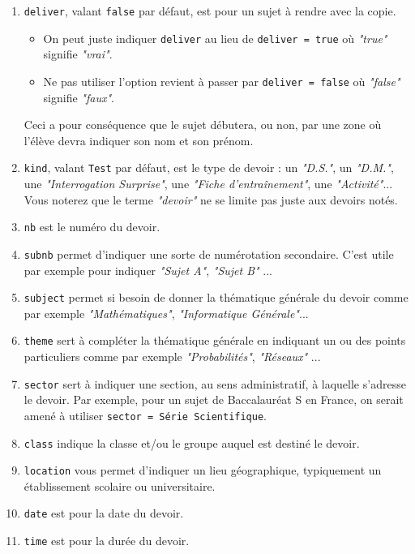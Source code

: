 \documentclass[12pt,a4paper]{scrartcl}
\theoremstyle{definition}
\begin{document}
\begin{enumerate}
	\item \verb+deliver+, valant \verb+false+ par défaut, est pour un sujet à rendre avec la copie. 
	\begin{itemize}[label=\textbullet]
		\setlength\itemsep{0em}

		\item On peut juste indiquer \verb+deliver+ au lieu de \verb+deliver = true+ où \emph{"true"} signifie \emph{"vrai"}.

		\item Ne pas utiliser l'option revient à passer par \verb+deliver = false+ où \emph{"false"} signifie \emph{"faux"}.
	\end{itemize}
	Ceci a pour conséquence que le sujet débutera, ou non, par une zone où l'élève devra indiquer son nom et son prénom.

	\item \verb+kind+, valant \verb+Test+ par défaut, est le type de devoir : un \emph{"D.S."}, un \emph{"D.M."}, une \emph{"Interrogation Surprise"}, une \emph{"Fiche d'entraînement"}, une \emph{"Activité"}...
	Vous noterez que le terme \emph{"devoir"} ne se limite pas juste aux devoirs notés.

	\item \verb+nb+ est le numéro du devoir.

	\item \verb+subnb+ permet d'indiquer une sorte de numérotation secondaire. C'est utile par exemple pour indiquer \emph{"Sujet A"}, \emph{"Sujet B"} ...

	\item \verb+subject+ permet si besoin de donner la thématique générale du devoir comme par exemple \emph{"Mathématiques"}, \emph{"Informatique Générale"}...

	\item \verb+theme+ sert à compléter la thématique générale en indiquant un ou des points particuliers comme par exemple \emph{"Probabilités"}, \emph{"Réseaux"} ...

	\item \verb+sector+ sert à indiquer une section, au sens administratif, à laquelle s'adresse le devoir. Par exemple, pour un sujet de Baccalauréat S en France, on serait amené à utiliser \verb+sector = Série Scientifique+.

	\item \verb+class+ indique la classe et/ou le groupe auquel est destiné le devoir.

	\item \verb+location+ vous permet d'indiquer un lieu géographique, typiquement un établissement scolaire ou universitaire.

	\item \verb+date+ est pour la date du devoir.

	\item \verb+time+ est pour la durée du devoir.
\end{enumerate}
\end{document}
